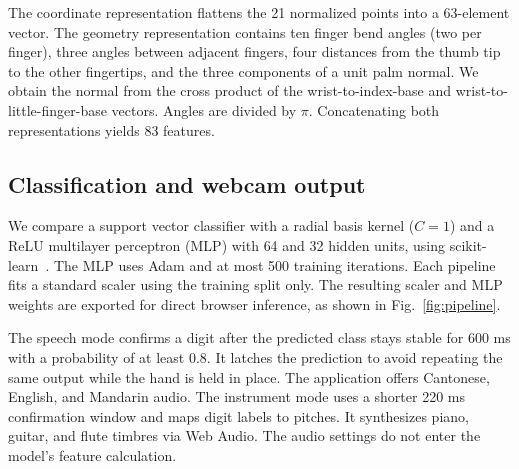 The coordinate representation flattens the 21 normalized points into a
63-element vector. The geometry representation contains ten finger bend
angles (two per finger), three angles between adjacent fingers, four
distances from the thumb tip to the other fingertips, and the three
components of a unit palm normal. We obtain the normal from the cross
product of the wrist-to-index-base and wrist-to-little-finger-base vectors.
Angles are divided by $\pi$. Concatenating both representations yields 83
features.

\subsection{Classification and webcam output}

We compare a support vector classifier with a radial basis kernel ($C=1$)
and a ReLU multilayer perceptron (MLP) with 64 and 32 hidden units, using
scikit-learn~\cite{pedregosa2011sklearn}. The MLP uses Adam and at most 500
training iterations. Each pipeline fits a standard scaler using the training
split only. The resulting scaler and MLP weights are exported for direct
browser inference, as shown in Fig.~\ref{fig:pipeline}.

The speech mode confirms a digit after the predicted class stays stable for
600 ms with a probability of at least 0.8. It latches the prediction to avoid
repeating the same output while the hand is held in place. The application
offers Cantonese, English, and Mandarin audio. The instrument mode uses a
shorter 220 ms confirmation window and maps digit labels to pitches. It
synthesizes piano, guitar, and flute timbres via Web Audio. The audio settings
do not enter the model's feature calculation.
